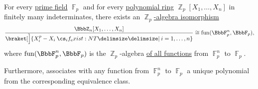 \begin{proposition}\label{thm:functions_over_prime_fields}
  For every \hyperref[thm:prime_fields]{prime field} \hyperref[thm:ring_of_integers_modulo]{\( \BbbF_p \)} and for every \hyperref[def:polynomial_semiring]{polynomial ring} \( \BbbZ_p[X_1, \ldots, X_n] \) in finitely many indeterminates, there exists an \hyperref[def:algebra_over_ring]{\( \BbbZ_p \)-algebra isomorphism}
  \begin{equation*}
    \frac {\BbbZ_n[X_1, \ldots, X_n]} {\braket[\Big]{ X_i^p - X_i \given* i = 1, \ldots, n }} \cong \fun(\BbbF_p^n, \BbbF_p),
  \end{equation*}
  where \( \fun(\BbbF_p^n, \BbbF_p) \) is the \( \BbbZ_p \)-algebra \hyperref[thm:functions_over_semimodule]{of all functions} from \( \BbbF_p^n \) to \( \BbbF_p \).

  Furthermore,  associates with any function from \( \BbbF_p^n \) to \( \BbbF_p \) a unique polynomial from the corresponding equivalence class.
\end{proposition}

